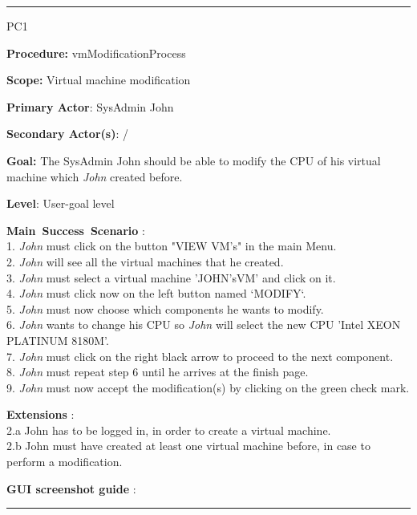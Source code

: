 \hrule
\vspace{0.5cm}
\begin{lyxlist}{PC1}
\small{
\item [\textbf{Procedure:}] vmModificationProcess
\item [\textbf{Scope:}] Virtual machine modification
\item [\textbf{Primary Actor}:] SysAdmin John 
\item [\textbf{Secondary Actor(s)}:] /
\item [\textbf{Goal:}] The SysAdmin John should be able to modify the CPU of
his virtual machine which \emph{John} created before.
\item [\textbf{Level}:] User-goal level
\item [\textbf{Main~Success~Scenario}]:\\
1. \emph{John} must click on the button "VIEW VM's" in the main Menu.\\
2. \emph{John} will see all the virtual machines that he created.\\
3. \emph{John} must select a virtual machine 'JOHN'sVM' and click on it.\\
4. \emph{John} must click now on the left button named `MODIFY`.\\
5. \emph{John} must now choose which components he wants to modify.\\
6. \emph{John} wants to change his CPU so \emph{John} will select the new CPU
'Intel XEON PLATINUM 8180M'.\\
7. \emph{John} must click on the right black arrow to proceed to the next
component. \\
8. \emph{John} must repeat step 6 until he arrives at the finish page.\\
9. \emph{John} must now accept the modification(s) by clicking on the green
check mark.\\


\item [\textbf{Extensions}]:\\
2.a John has to be logged in, in order to create a virtual machine.\\
2.b John must have created at least one virtual machine before, in case to
perform a modification.\\

\item [\textbf{GUI screenshot guide}]:\\
}
\end{lyxlist}
\hrule
\vspace{0.5cm}









